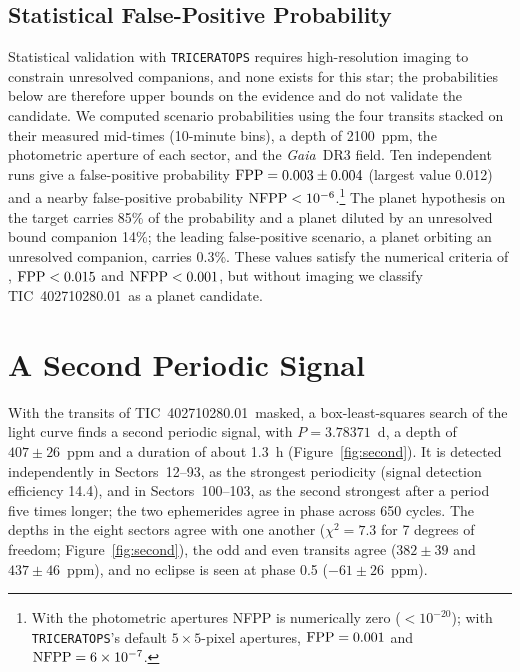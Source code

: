 \documentclass[twocolumn]{aastex631}
\newcommand{\planet}{TIC~402710280.01}
\newcommand{\gaia}{\textit{Gaia}}
\begin{document}
\subsection{Statistical False-Positive Probability} \label{sec:fpp}

Statistical validation with \texttt{TRICERATOPS} \citep{Giacalone2020, Giacalone2021} requires high-resolution imaging to constrain unresolved companions, and none exists for this star; the probabilities below are therefore upper bounds on the evidence and do not validate the candidate. We computed scenario probabilities using the four transits stacked on their measured mid-times (10-minute bins), a depth of 2100~ppm, the photometric aperture of each sector, and the \gaia\ DR3 field. Ten independent runs give a false-positive probability ${\rm FPP} = 0.003 \pm 0.004$ (largest value 0.012) and a nearby false-positive probability ${\rm NFPP} < 10^{-6}$.\footnote{With the photometric apertures NFPP is numerically zero ($<10^{-20}$); with \texttt{TRICERATOPS}'s default $5 \times 5$-pixel apertures, ${\rm FPP} = 0.001$ and ${\rm NFPP} = 6 \times 10^{-7}$.} The planet hypothesis on the target carries 85\% of the probability and a planet diluted by an unresolved bound companion 14\%; the leading false-positive scenario, a planet orbiting an unresolved companion, carries 0.3\%. These values satisfy the numerical criteria of \citet{Giacalone2021}, ${\rm FPP} < 0.015$ and ${\rm NFPP} < 0.001$, but without imaging we classify \planet\ as a planet candidate.

\section{A Second Periodic Signal} \label{sec:second}

With the transits of \planet\ masked, a box-least-squares search \citep{Kovacs2002} of the light curve finds a second periodic signal, with $P = 3.78371$~d, a depth of $407 \pm 26$~ppm and a duration of about 1.3~h (Figure~\ref{fig:second}). It is detected independently in Sectors~12--93, as the strongest periodicity (signal detection efficiency 14.4), and in Sectors~100--103, as the second strongest after a period five times longer; the two ephemerides agree in phase across 650 cycles. The depths in the eight sectors agree with one another ($\chi^2 = 7.3$ for 7 degrees of freedom; Figure~\ref{fig:second}), the odd and even transits agree ($382 \pm 39$ and $437 \pm 46$~ppm), and no eclipse is seen at phase 0.5 ($-61 \pm 26$~ppm).
\end{document}

